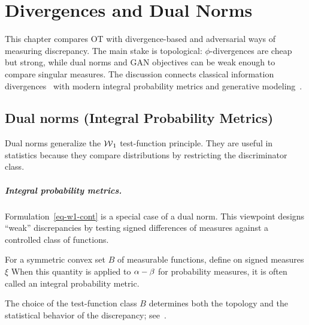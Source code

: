 \chapter{Divergences and Dual Norms}

\label{sec-divergences-dual-norms}


This chapter compares OT with divergence-based and adversarial ways of measuring discrepancy. The main stake is topological: $\phi$-divergences are cheap but strong, while dual norms and GAN objectives can be weak enough to compare singular measures. The discussion connects classical information divergences~\cite{ciszar1967information,ali1966general} with modern integral probability metrics and generative modeling~\cite{sriperumbudur2009integral,GAN,WassersteinGAN}.

\section{Dual norms (Integral Probability Metrics)}
\label{sec-dual-norms}

Dual norms generalize the $\operatorname{\mathcal{W}}_1$ test-function principle. They are useful in statistics because they compare distributions by restricting the discriminator class.

\paragraph{Integral probability metrics.}

Formulation~\eqref{eq-w1-cont} is a special case of a dual norm. This viewpoint designs ``weak'' discrepancies by testing signed differences of measures against a controlled class of functions.

\begin{defn}\label{def-dual-norm-ipm}
	For a symmetric convex set $B$ of measurable functions, define on signed measures $\xi$
	When this quantity is applied to $\alpha-\beta$ for probability measures, it is often called an integral probability metric.
\end{defn}
The choice of the test-function class $B$ determines both the topology and the statistical behavior of the discrepancy; see~\cite{sriperumbudur2012empirical,sriperumbudur2009integral,sriperumbudur2008injective}.

